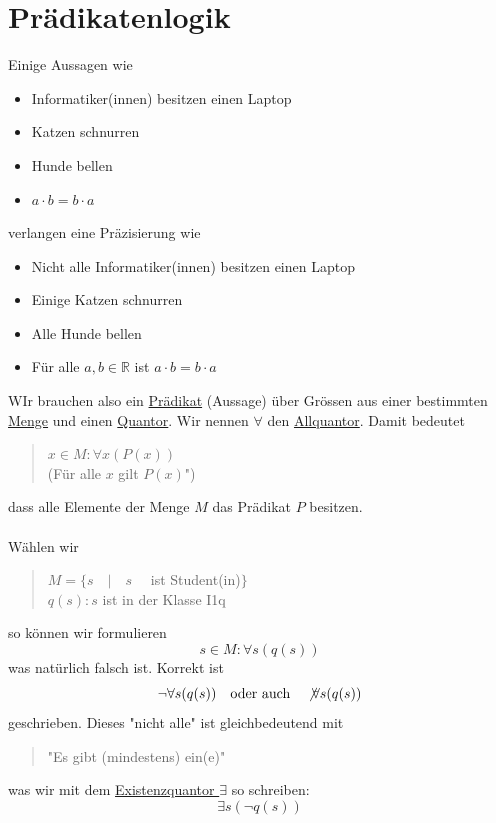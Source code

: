\documentclass{report}
\begin{document}
\section{Prädikatenlogik}
Einige Aussagen wie
\begin{itemize}
\item Informatiker(innen) besitzen einen Laptop
\item Katzen schnurren
\item Hunde bellen
\item $a \cdot b = b \cdot a$\end{itemize}
verlangen eine Präzisierung wie
\begin{itemize}
\item Nicht alle Informatiker(innen) besitzen einen Laptop
\item Einige Katzen schnurren
\item Alle Hunde bellen
\item Für alle $a,b \in \mathbb{R}$ ist $a \cdot b = b \cdot a$\end{itemize}
WIr brauchen also ein \underline{Prädikat} (Aussage) über Grössen aus einer bestimmten \underline{Menge} und einen \underline{Quantor}.
Wir nennen $\forall$ den \underline{Allquantor}. Damit bedeutet
\begin{quote}$x \in M: \forall x (P(x))$\\
(Für alle $x$ gilt $P(x)$")\end{quote}
dass alle Elemente der Menge $M$ das Prädikat $P$ besitzen.\\\\
Wählen wir
\begin{quote}$M = \{s \quad|\quad s \quad$ ist Student(in)$\}$ \\
$q(s): s$ ist in der Klasse I1q\end{quote}
so können wir formulieren
\begin{equation}s \in M : \forall s (q(s))\end{equation}
was natürlich falsch ist. Korrekt ist
\begin{equation}\lnot \forall s (q(s)) \quad \mbox{oder auch} \quad \not \forall s(q(s))\end{equation}
geschrieben. Dieses "nicht alle" ist gleichbedeutend mit
\begin{quote}"Es gibt (mindestens) ein(e)"\end{quote}
was wir mit dem \underline{Existenzquantor $\exists$} so schreiben:
\begin{equation}\exists s(\lnot q(s))\end{equation}
\end{document}
